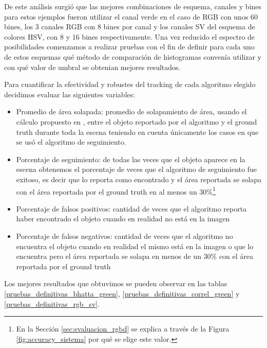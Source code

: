 De este análisis surgió que las mejores combinaciones de esquema, canales y bines para estos ejemplos fueron utilizar el canal verde en el caso de RGB con unos 60 bines, los 3 canales RGB con 8 bines por canal y los canales SV del esquema de colores HSV, con 8 y 16 bines respectivamente. Una vez reducido el espectro de posibilidades comenzamos a realizar pruebas con el fin de definir para cada uno de estos esquemas qué método de comparación de histogramas convenía utilizar y con qué valor de umbral se obtenian mejores resultados.

Para cuantificar la efectividad y robustes del tracking de cada algoritmo elegido decidimos evaluar las siguientes variables:
\begin{itemize}
	\item Promedio de área solapada: promedio de solapamiento de área, usando el cálculo propuesto en \cite{everinghampascal}, entre el objeto reportado por el algoritmo y el ground truth durante toda la escena teniendo en cuenta únicamente los casos en que se usó el algoritmo de seguimiento.
	\item Porcentaje de seguimiento: de todas las veces que el objeto aparece en la escena obtenemos el porcentaje de veces que el algoritmo de seguimiento fue exitoso, es decir que lo reporta como encontrado y el área reportada se solapa con el área reportada por el ground truth en al menos un 30\%\footnote{En la Sección \ref{sec:evaluacion_rgbd} se explica a través de la Figura \ref{fig:accuracy_sistema} por qué se elige este valor.}
	\item Porcentaje de falsos positivos: cantidad de veces que el algoritmo reporta haber encontrado el objeto cuando en realidad no está en la imagen
	\item Porcentaje de falsos negativos: cantidad de veces que el algoritmo no encuentra el objeto cuando en realidad el mismo está en la imagen o que lo encuentra pero el área reportada se solapa en menos de un 30\% con el área reportada por el ground truth
\end{itemize}

Los mejores resultados que obtuvimos se pueden observar en las tablas \ref{pruebas_definitivas_bhatta_green}, \ref{pruebas_definitivas_correl_green} y \ref{pruebas_definitivas_rgb_sv}.

